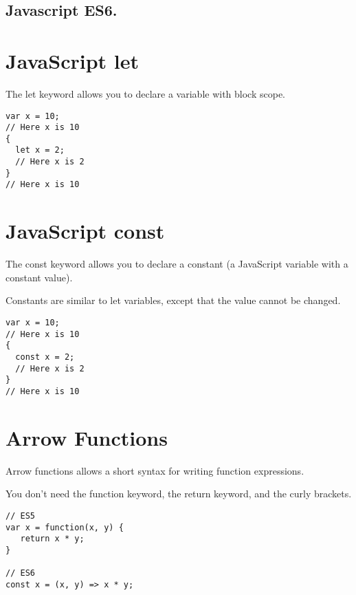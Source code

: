 \documentclass[a4paper,12pt]{article}
\begin{document}


\begin{large}

\begin{center}
\section*{Javascript ES6.}
\end{center}

\medskip

\section*{JavaScript let}

The let keyword allows you to declare a variable with block scope.

\begin{lstlisting}
var x = 10;
// Here x is 10
{
  let x = 2;
  // Here x is 2
}
// Here x is 10
\end{lstlisting}



\section*{JavaScript const}

The const keyword allows you to declare a constant (a JavaScript variable with a constant value).

Constants are similar to let variables, except that the value cannot be changed.

\begin{lstlisting}
var x = 10;
// Here x is 10
{
  const x = 2;
  // Here x is 2
}
// Here x is 10
\end{lstlisting}




\section*{Arrow Functions}

Arrow functions allows a short syntax for writing function expressions.

You don't need the function keyword, the return keyword, and the curly brackets.

\begin{lstlisting}
// ES5
var x = function(x, y) {
   return x * y;
}

// ES6
const x = (x, y) => x * y;
\end{lstlisting}


\end{large}
\end{document}
